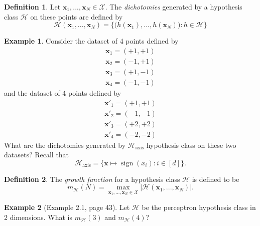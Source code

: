 \documentclass[10pt]{exam}
\theoremstyle{definition}
\newtheorem{problem}{Problem}
\newtheorem{example}{Example}
\newtheorem{defn}{Definition}
\DeclareMathOperator{\sign}{sign}
\newcommand{\x}{\mathbf x}
\newcommand{\mH}{m_{\mathcal H}}
\newcommand{\HH}[1]{\mathcal H_{\text{#1}}}
\begin{document}
\begin{defn}
    Let $\x_1,...,\x_N \in \mathcal X$.
    The \emph{dichotomies} generated by a hypothesis class $\mathcal H$ on these points are defined by
    \begin{equation}
        \mathcal H(\x_1, ..., \x_N) = \bigg\{ \big(h(\x_1), ..., h(\x_N)\big) : h \in \mathcal H \bigg\}
    \end{equation}
\end{defn}

\begin{example}
    Consider the dataset of 4 points defined by
    \begin{align*}
    \x_1 = (+1,+1) \\
    \x_2 = (-1,+1) \\
    \x_3 = (+1,-1) \\
    \x_4 = (-1,-1)
    \end{align*}
    and the dataset of 4 points defined by
    \begin{align*}
    \x'_1 = (+1,+1) \\
    \x'_2 = (-1,-1) \\
    \x'_3 = (+2,+2) \\
    \x'_4 = (-2,-2)
    \end{align*}
    What are the dichotomies generated by $\HH{axis}$ hypothesis class on these two datasets?
    Recall that
    \begin{equation*}
    \HH{axis} = \bigg\{ \x \mapsto \sign(x_i) : i \in [d] \bigg\}.
    \end{equation*}
\end{example}



\newpage
\begin{defn}
    The \emph{growth function} for a hypothesis class $\mathcal H$ is defined to be
    \begin{equation}
        m_{\mathcal H}(N) = \max_{\x_1,...,\x_N\in\mathcal X} \big| \mathcal H(\x_1, ..., \x_N) \big|.
    \end{equation}
\end{defn}
\begin{example}
    [Example 2.1, page 43]
    Let $\mathcal H$ be the perceptron hypothesis class in 2 dimensions.
    What is $\mH(3)$ and $\mH(4)$?
\end{example}
\vspace{2in}
\end{document}
